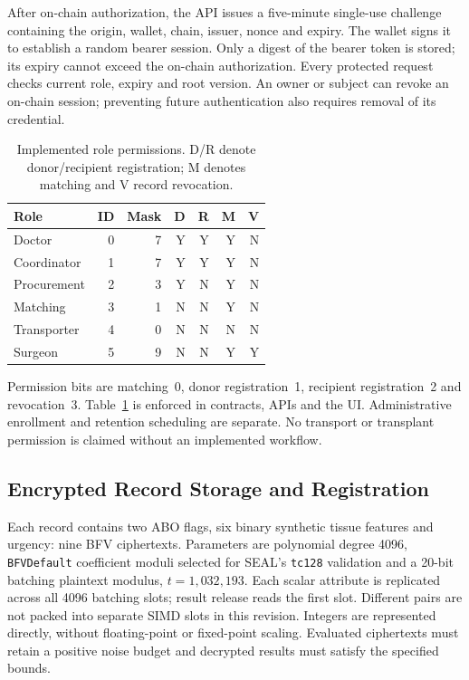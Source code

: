 \documentclass[10pt,twocolumn,a4paper]{article}
\newcommand{\code}[1]{\texttt{#1}}
\begin{document}
After on-chain authorization, the API issues a five-minute single-use challenge
containing the origin, wallet, chain, issuer, nonce and expiry. The wallet signs it
to establish a random bearer session. Only a digest of the bearer token is stored;
its expiry cannot exceed the on-chain authorization. Every protected request checks
current role, expiry and root version. An owner or subject can revoke an on-chain
session; preventing future authentication also requires removal of its credential.

\begin{table}[t]
\centering\scriptsize
\caption{Implemented role permissions. D/R denote donor/recipient registration; M denotes matching and V record revocation.}
\label{tab:roles}
\renewcommand{\arraystretch}{1.12}
\begin{tabularx}{\columnwidth}{Xrrrrrr}
\toprule Role & ID & Mask & D & R & M & V\\\midrule
Doctor & 0 & 7 & Y & Y & Y & N\\
Coordinator & 1 & 7 & Y & Y & Y & N\\
Procurement & 2 & 3 & Y & N & Y & N\\
Matching & 3 & 1 & N & N & Y & N\\
Transporter & 4 & 0 & N & N & N & N\\
Surgeon & 5 & 9 & N & N & Y & Y\\\bottomrule
\end{tabularx}
\end{table}

Permission bits are matching~0, donor registration~1, recipient registration~2
and revocation~3. Table~\ref{tab:roles} is enforced in contracts, APIs and the UI.
Administrative enrollment and retention scheduling are separate. No transport or
transplant permission is claimed without an implemented workflow.

\subsection{Encrypted Record Storage and Registration}
Each record contains two ABO flags, six binary synthetic tissue features and
urgency: nine BFV ciphertexts. Parameters are polynomial degree 4096,
\code{BFVDefault} coefficient moduli selected for SEAL's \code{tc128} validation
and a 20-bit batching plaintext modulus, $t=1{,}032{,}193$. Each scalar attribute
is replicated across all 4096 batching slots; result release reads the first slot.
Different pairs are not packed into separate SIMD slots in this revision. Integers
are represented directly, without floating-point or fixed-point scaling. Evaluated ciphertexts must retain a positive
noise budget and decrypted results must satisfy the specified bounds.
\end{document}
